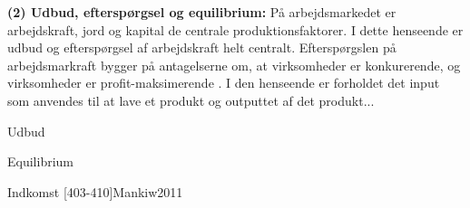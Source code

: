 \noindent \textbf{(2) Udbud, efterspørgsel og equilibrium:} 
På arbejdsmarkedet er arbejdskraft, jord og kapital de centrale produktionsfaktorer. I dette henseende er udbud og efterspørgsel af arbejdskraft helt centralt. Efterspørgslen på arbejdsmarkraft bygger på antagelserne om, at virksomheder er konkurerende, og virksomheder er profit-maksimerende \parencite[383]{Mankiw2011}. I den henseende er forholdet det input som anvendes til at lave et produkt og outputtet af det produkt... \parencite[383-388]{Mankiw2011}

Udbud \parencite[388-390]{Mankiw2011}

Equilibrium \parencite[390-395]{Mankiw2011}

Indkomst [403-410]{Mankiw2011}


